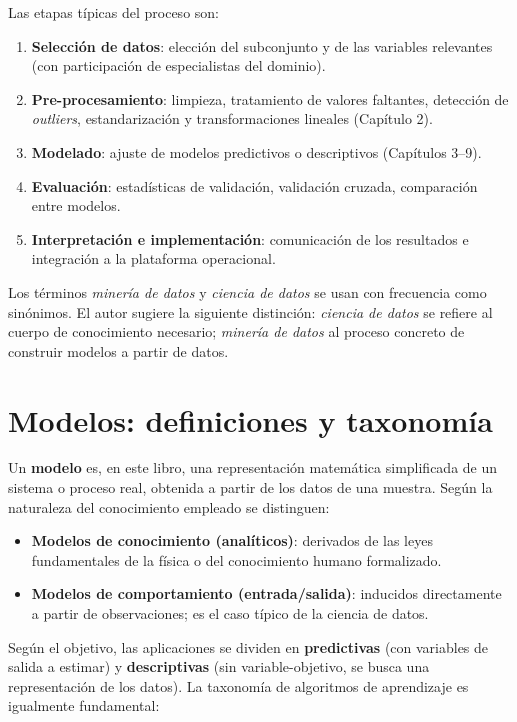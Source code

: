 Las etapas típicas del proceso son:
\begin{enumerate}[label=\textbf{(\arabic*)}, leftmargin=1.2cm]
  \item \textbf{Selección de datos}: elección del subconjunto y de las
        variables relevantes (con participación de especialistas del
        dominio).
  \item \textbf{Pre-procesamiento}: limpieza, tratamiento de valores
        faltantes, detección de \emph{outliers}, estandarización y
        transformaciones lineales (Capítulo 2).
  \item \textbf{Modelado}: ajuste de modelos predictivos o descriptivos
        (Capítulos 3--9).
  \item \textbf{Evaluación}: estadísticas de validación, validación
        cruzada, comparación entre modelos.
  \item \textbf{Interpretación e implementación}: comunicación de los
        resultados e integración a la plataforma operacional.
\end{enumerate}

Los términos \emph{minería de datos} y \emph{ciencia de datos} se usan
con frecuencia como sinónimos. El autor sugiere la siguiente distinción:
\emph{ciencia de datos} se refiere al cuerpo de conocimiento necesario;
\emph{minería de datos} al proceso concreto de construir modelos a partir
de datos.

\section{Modelos: definiciones y taxonomía}

Un \textbf{modelo} es, en este libro, una representación matemática
simplificada de un sistema o proceso real, obtenida a partir de los datos
de una muestra. Según la naturaleza del conocimiento empleado se
distinguen:

\begin{itemize}[leftmargin=1.2cm]
  \item \textbf{Modelos de conocimiento (analíticos)}: derivados de las
        leyes fundamentales de la física o del conocimiento humano
        formalizado.
  \item \textbf{Modelos de comportamiento (entrada/salida)}: inducidos
        directamente a partir de observaciones; es el caso típico de la
        ciencia de datos.
\end{itemize}

Según el objetivo, las aplicaciones se dividen en \textbf{predictivas}
(con variables de salida a estimar) y \textbf{descriptivas} (sin
variable-objetivo, se busca una representación de los datos). La
taxonomía de algoritmos de aprendizaje es igualmente fundamental:


